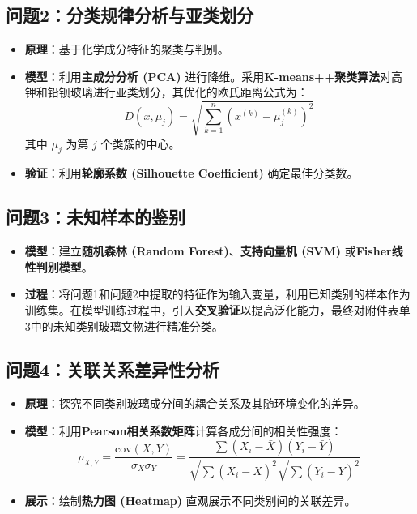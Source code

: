 \documentclass[UTF8, zihao=-4]{ctexart}
\begin{document}
\subsection{问题2：分类规律分析与亚类划分}
\begin{itemize}
    \item \textbf{原理}：基于化学成分特征的聚类与判别。
    \item \textbf{模型}：利用\textbf{主成分分析 (PCA)} 进行降维。采用\textbf{K-means++聚类算法}对高钾和铅钡玻璃进行亚类划分，其优化的欧氏距离公式为：
    \begin{equation}
        D(x, \mu_j) = \sqrt{\sum_{k=1}^{n} (x^{(k)} - \mu_j^{(k)})^2}
    \end{equation}
    其中 $\mu_j$ 为第 $j$ 个类簇的中心。
    \item \textbf{验证}：利用\textbf{轮廓系数 (Silhouette Coefficient)} 确定最佳分类数。
\end{itemize}

\subsection{问题3：未知样本的鉴别}
\begin{itemize}
    \item \textbf{模型}：建立\textbf{随机森林 (Random Forest)}、\textbf{支持向量机 (SVM)} 或\textbf{Fisher线性判别模型}。
    \item \textbf{过程}：将问题1和问题2中提取的特征作为输入变量，利用已知类别的样本作为训练集。在模型训练过程中，引入\textbf{交叉验证}以提高泛化能力，最终对附件表单3中的未知类别玻璃文物进行精准分类。
\end{itemize}

\subsection{问题4：关联关系差异性分析}
\begin{itemize}
    \item \textbf{原理}：探究不同类别玻璃成分间的耦合关系及其随环境变化的差异。
    \item \textbf{模型}：利用\textbf{Pearson相关系数矩阵}计算各成分间的相关性强度：
    \begin{equation}
        \rho_{X,Y} = \frac{\text{cov}(X,Y)}{\sigma_X \sigma_Y} = \frac{\sum (X_i - \bar{X})(Y_i - \bar{Y})}{\sqrt{\sum (X_i - \bar{X})^2} \sqrt{\sum (Y_i - \bar{Y})^2}}
    \end{equation}
    \item \textbf{展示}：绘制\textbf{热力图 (Heatmap)} 直观展示不同类别间的关联差异。
\end{itemize}
\end{document}
